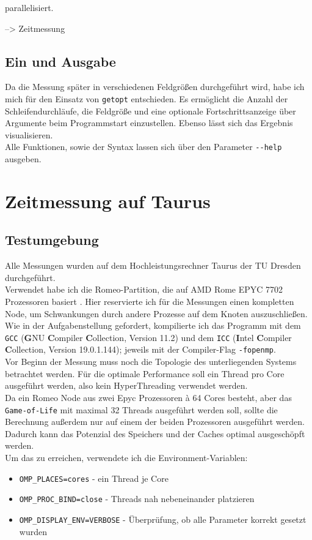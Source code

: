 \documentclass[german,plainarticle,hyperref,utf8,appendix]{zihpub}
\begin{document}
   	parallelisiert.
       
       --> Zeitmessung
   	
   	
   	\subsection{Ein und Ausgabe}
   	Da die Messung später in verschiedenen Feldgrößen durchgeführt wird, habe ich mich für den Einsatz von \verb|getopt| entschieden. Es ermöglicht die Anzahl der Schleifendurchläufe, die Feldgröße und eine optionale Fortschrittsanzeige über Argumente beim Programmstart einzustellen.
   	Ebenso lässt sich das Ergebnis visualisieren.\\
   	Alle Funktionen, sowie der Syntax lassen sich über den Parameter \texttt{-{}-help} ausgeben.
   	
   	\section{Zeitmessung auf Taurus}
   	\subsection{Testumgebung}
   	Alle Messungen wurden auf dem Hochleistungsrechner Taurus der TU Dresden durchgeführt.\\
   	Verwendet habe ich die Romeo-Partition, die auf AMD Rome EPYC 7702 Prozessoren basiert \cite{hpc}. Hier reservierte ich für die Messungen einen kompletten Node, um Schwankungen durch andere Prozesse auf dem Knoten auszuschließen.\\
   	Wie in der Aufgabenstellung gefordert, kompilierte ich das Programm mit dem \texttt{GCC} (\textbf{G}NU \textbf{C}ompiler \textbf{C}ollection, Version 11.2) und dem \texttt{ICC} (\textbf{I}ntel \textbf{C}ompiler \textbf{C}ollection, Version 19.0.1.144); jeweils mit der Compiler-Flag \texttt{-fopenmp}.\\
   	
   	Vor Beginn der Messung muss noch die Topologie des unterliegenden Systems betrachtet werden. Für die optimale Performance soll ein Thread pro Core ausgeführt werden, also kein HyperThreading verwendet werden.\\
   	Da ein Romeo Node aus zwei Epyc Prozessoren \`{a} 64 Cores besteht, aber das \texttt{Game-of-Life} mit maximal 32 Threads ausgeführt werden soll, sollte die Berechnung außerdem nur auf einem der beiden Prozessoren ausgeführt werden. Dadurch kann das Potenzial des Speichers und der Caches optimal ausgeschöpft werden.\\
   	Um das zu erreichen, verwendete ich die Environment-Variablen:
   	\begin{itemize}
   	\item \texttt{OMP\_PLACES=cores} - ein Thread je Core
   	\item \texttt{OMP\_PROC\_BIND=close} - Threads nah nebeneinander platzieren
   	\item \texttt{OMP\_DISPLAY\_ENV=VERBOSE} - Überprüfung, ob alle Parameter korrekt gesetzt wurden
   	\end{itemize}
   
\end{document}
